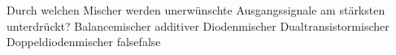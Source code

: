     {Durch welchen Mischer werden unerwünschte Ausgangssignale am stärksten unterdrückt?}
    {Balancemischer}
    {additiver Diodenmischer}
    {Dualtransistormischer}
    {Doppeldiodenmischer}
    {false}{false}